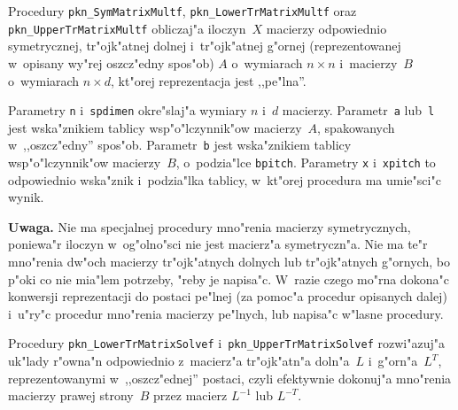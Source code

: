 \vspace{\bigskipamount}
\begin{sloppypar}
Procedury \texttt{pkn\_SymMatrixMultf}, \texttt{pkn\_LowerTrMatrixMultf} oraz \\
\texttt{pkn\_UpperTrMatrixMultf} obliczaj"a iloczyn~$X$ macierzy odpowiednio
symetrycznej, tr"ojk"atnej dolnej i~tr"ojk"atnej g"ornej (reprezentowanej
w~opisany wy"rej oszcz"edny spos"ob) $A$ o~wymiarach $n\times n$
i~macierzy~$B$ o~wymiarach $n\times d$, kt"orej reprezentacja jest ,,pe"lna''.
\end{sloppypar}

Parametry \texttt{n} i~\texttt{spdimen} okre"slaj"a wymiary $n$ i~$d$ macierzy.
Parametr~\texttt{a} lub~\texttt{l} jest wska"znikiem tablicy wsp"o"lczynnik"ow
macierzy~$A$, spakowanych w~,,oszcz"edny'' spos"ob. Parametr~\texttt{b} jest
wska"znikiem tablicy wsp"o"lczynnik"ow macierzy~$B$, o~podzia"lce \texttt{bpitch}.
Parametry \texttt{x} i~\texttt{xpitch} to odpowiednio wska"znik i~podzia"lka
tablicy, w~kt"orej procedura ma umie"sci"c wynik.

\vspace{\medskipamount}
\noindent
\textbf{Uwaga.}
Nie ma specjalnej procedury mno"renia macierzy symetrycznych, poniewa"r
iloczyn w~og"olno"sci nie jest macierz"a symetryczn"a. Nie ma te"r mno"renia
dw"och macierzy tr"ojk"atnych dolnych lub tr"ojk"atnych g"ornych, bo p"oki co
nie mia"lem potrzeby, "reby je napisa"c. W~razie czego mo"rna dokona"c
konwersji reprezentacji do postaci pe"lnej (za pomoc"a procedur opisanych
dalej) i~u"ry"c procedur mno"renia macierzy pe"lnych, lub napisa"c w"lasne
procedury.

\vspace{\bigskipamount}
Procedury \texttt{pkn\_LowerTrMatrixSolvef} i~\texttt{pkn\_UpperTrMatrixSolvef}
rozwi"azuj"a uk"lady r"owna"n odpowiednio z~macierz"a tr"ojk"atn"a doln"a~$L$
i~g"orn"a~$L^T$, reprezentowanymi w~,,oszcz"ednej'' postaci, czyli
efektywnie dokonuj"a mno"renia macierzy prawej strony~$B$ przez macierz
$L^{-1}$ lub $L^{-T}$.

